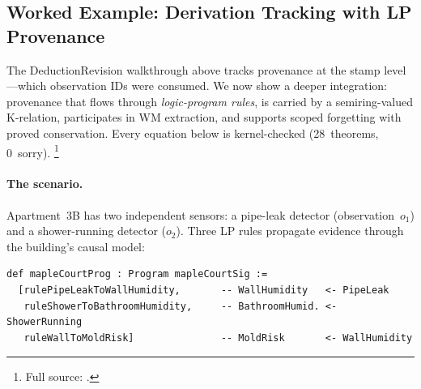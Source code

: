 \documentclass[11pt,openany]{report}
\begin{document}
\subsection{Worked Example: Derivation Tracking with LP Provenance}
\label{sec:derivation-tracking-demo}

The DeductionRevision walkthrough above tracks provenance at the
stamp level---which observation IDs were consumed.  We now show a
deeper integration: provenance that flows through \emph{logic-program
rules}, is carried by a semiring-valued K-relation, participates in
WM extraction, and supports scoped forgetting with proved
conservation.  Every equation below is kernel-checked (28~theorems,
0~sorry).%
\footnote{Full source:
.}

\paragraph{The scenario.}
Apartment~3B has two independent sensors: a pipe-leak detector
(observation~$o_1$) and a shower-running detector ($o_2$).  Three
LP rules propagate evidence through the building's causal model:

\begin{lstlisting}[language={}]
def mapleCourtProg : Program mapleCourtSig :=
  [rulePipeLeakToWallHumidity,       -- WallHumidity   <- PipeLeak
   ruleShowerToBathroomHumidity,     -- BathroomHumid. <- ShowerRunning
   ruleWallToMoldRisk]               -- MoldRisk       <- WallHumidity
\end{lstlisting}
\end{document}

